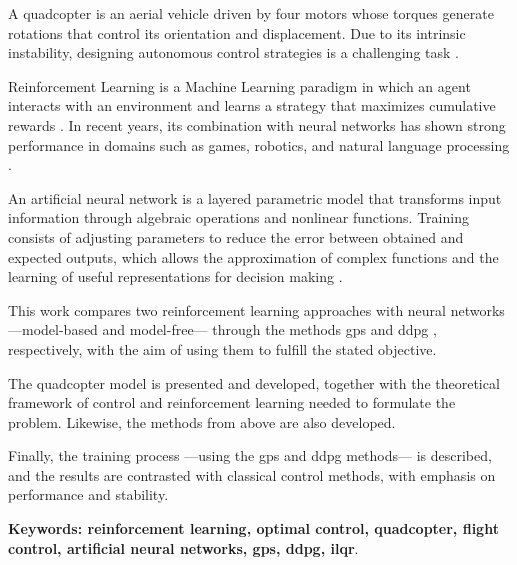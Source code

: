 \documentclass[letterpaper, 12pt, oneside]{book}
\theoremstyle{plain}
\begin{document}
A quadcopter is an aerial vehicle driven by four motors whose torques generate rotations that control its orientation and displacement. Due to its intrinsic instability, designing autonomous control strategies is a challenging task \cite{fang-i2019}.

Reinforcement Learning is a Machine Learning paradigm in which an agent interacts with an environment and learns a strategy that maximizes cumulative rewards \cite{Sutton2000}. In recent years, its combination with neural networks has shown strong performance in domains such as games, robotics, and natural language processing \cite{lapan2018deep}.

An artificial neural network is a layered parametric model that transforms input information through algebraic operations and nonlinear functions. Training consists of adjusting parameters to reduce the error between obtained and expected outputs, which allows the approximation of complex functions and the learning of useful representations for decision making \cite{Bishop2006, Goodfellow-et-al-2016}.

This work compares two reinforcement learning approaches with neural networks —model-based and model-free— through the methods \acrfull{gps} \cite{2014-mfcgps} and \acrfull{ddpg} \cite{lillicrap2015continuous}, respectively, with the aim of using them to fulfill the stated objective.

The quadcopter model is presented and developed, together with the theoretical framework of control and reinforcement learning needed to formulate the problem. Likewise, the methods from above are also developed.

Finally, the training process —using the \acrshort{gps} and \acrshort{ddpg} methods— is described, and the results are contrasted with classical control methods, with emphasis on performance and stability.

\textbf{Keywords: reinforcement learning, optimal control, quadcopter, flight control, artificial neural networks, \acrshort{gps}, \acrshort{ddpg}, \acrshort{ilqr}}.
\newpage



\tableofcontents{}
\thispagestyle{empty}
\listoffigures
\listoftables

\printnoidxglossary[type=\acronymtype,title=Siglas,sort=use]

\cleardoublepage
{}
\end{document}
